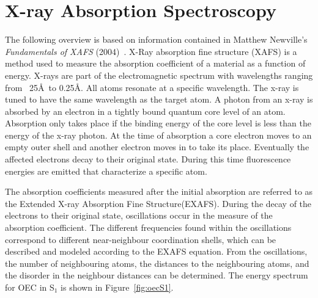 \section{X-ray Absorption Spectroscopy}

The following overview is based on information contained in Matthew Newville's \textit{Fundamentals of XAFS} (2004)~\cite{newville2004fundamentals}. X-Ray absorption fine structure (XAFS) is a method used to measure the absorption coefficient of a material as a function of energy. X-rays are part of the electromagnetic spectrum with wavelengths ranging from ~25\AA\ to 0.25\AA. All atoms resonate at a specific wavelength. The x-ray is tuned to have the same wavelength as the target atom. A photon from an x-ray is absorbed by an electron in a tightly bound quantum core level of an atom. Absorption only takes place if the binding energy of the core level is less than the energy of the x-ray photon. At the time of absorption a core electron moves to an empty outer shell and another electron moves in to take its place. Eventually the affected electrons decay to their original state. During this time fluorescence energies are emitted that characterize a specific atom.

The absorption coefficients measured after the initial absorption are referred to as the Extended X-ray Absorption Fine Structure(EXAFS). During the decay of the electrons to their original state, oscillations occur in the measure of the absorption coefficient. The different frequencies found within the oscillations correspond to different near-neighbour coordination shells, which can be described and modeled according to the EXAFS equation. From the oscillations, the number of neighbouring atoms, the distances to the neighbouring atoms, and the disorder in the neighbour distances can be determined. The energy spectrum for OEC in S$_{1}$ is shown in Figure~\ref{fig:oecS1}.

\begin{figure*}
	\caption{EXAFS Spectra of OEC in S$_{1}$}
	\label{fig:oecS1}
\end{figure*}